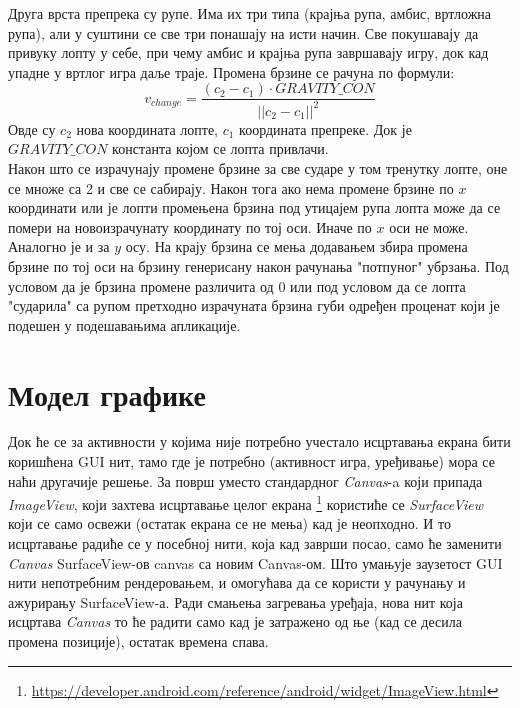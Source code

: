 Друга врста препрека су рупе.
Има их три типа (крајња рупа, амбис, вртложна рупа), али у суштини се све три понашају на исти начин. Све покушавају да привуку лопту у себе, при чему амбис и крајња рупа завршавају игру, док кад упадне у вртлог игра даље траје.
Промена брзине се рачуна по формули:
$$v_{change} =  \frac{(c_2 - c_1) \cdot GRAVITY\_CON}{|| c_2-c_1||^2}$$
Овде су $c_2$ нова координата лопте, $c_1$ координата препреке. Док је $GRAVITY\_CON$ константа којом се лопта привлачи.
\\ \indent
Након што се израчунају промене брзине за све сударе у том тренутку лопте, оне се множе са 2 и све се сабирају. Након тога ако нема промене брзине по $x$ координати или је лопти промењена брзина под утицајем рупа лопта може да се помери на новоизрачунату координату по тој оси. Иначе по $x$ оси не може. Аналогно је и за $y$ осу. На крају брзина се мења додавањем збира промена брзине по тој оси на брзину генерисану након рачунања "потпуног" убрзања. Под условом да је брзина промене различита од 0 или под условом да се лопта "сударила" са рупом претходно израчуната брзина губи одређен проценат који је подешен у подешавањима апликације.

\section{Модел графике}
Док ће се за активности у којима није потребно учестало исцртавања екрана бити коришћена GUI нит, тамо где је потребно (активност игра, уређивање) мора се наћи другачије решење. За површ уместо стандардног \emph{Canvas}-a који припада \emph{ImageView}, који захтева исцртавање целог екрана \footnote{\url{https://developer.android.com/reference/android/widget/ImageView.html}} користиће се \emph{SurfaceView} који се само освежи (остатак екрана се не мења) кад је неопходно. И то исцртавање радиће се у посебној нити, која кад заврши посао, само ће заменити \emph{Canvas}  SurfaceView-ов canvas са новим Canvas-ом. Што умањује заузетост GUI нити непотребним рендеровањем, и омогућава да се користи у рачунању и ажурирању SurfaceView-а.
Ради смањења загревања уређаја, нова нит која исцртава \emph{Canvas} то ће радити само кад је затражено од ње (кад се десила промена позиције), остатак времена спава. 

